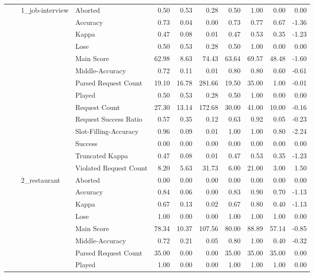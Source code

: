 \begin{tabular}{llllrrrrrrr}
\cline{3-11}
 &  & \multirow[t]{14}{*}{1_job-interview} & Aborted & 0.50 & 0.53 & 0.28 & 0.50 & 1.00 & 0.00 & 0.00 \\
 &  &  & Accuracy & 0.73 & 0.04 & 0.00 & 0.73 & 0.77 & 0.67 & -1.36 \\
 &  &  & Kappa & 0.47 & 0.08 & 0.01 & 0.47 & 0.53 & 0.35 & -1.23 \\
 &  &  & Lose & 0.50 & 0.53 & 0.28 & 0.50 & 1.00 & 0.00 & 0.00 \\
 &  &  & Main Score & 62.98 & 8.63 & 74.43 & 63.64 & 69.57 & 48.48 & -1.60 \\
 &  &  & Middle-Accuracy & 0.72 & 0.11 & 0.01 & 0.80 & 0.80 & 0.60 & -0.61 \\
 &  &  & Parsed Request Count & 19.10 & 16.78 & 281.66 & 19.50 & 35.00 & 1.00 & -0.01 \\
 &  &  & Played & 0.50 & 0.53 & 0.28 & 0.50 & 1.00 & 0.00 & 0.00 \\
 &  &  & Request Count & 27.30 & 13.14 & 172.68 & 30.00 & 41.00 & 10.00 & -0.16 \\
 &  &  & Request Success Ratio & 0.57 & 0.35 & 0.12 & 0.63 & 0.92 & 0.05 & -0.23 \\
 &  &  & Slot-Filling-Accuracy & 0.96 & 0.09 & 0.01 & 1.00 & 1.00 & 0.80 & -2.24 \\
 &  &  & Success & 0.00 & 0.00 & 0.00 & 0.00 & 0.00 & 0.00 & 0.00 \\
 &  &  & Truncated Kappa & 0.47 & 0.08 & 0.01 & 0.47 & 0.53 & 0.35 & -1.23 \\
 &  &  & Violated Request Count & 8.20 & 5.63 & 31.73 & 6.00 & 21.00 & 3.00 & 1.50 \\
\cline{3-11}
 &  & \multirow[t]{14}{*}{2_restaurant} & Aborted & 0.00 & 0.00 & 0.00 & 0.00 & 0.00 & 0.00 & 0.00 \\
 &  &  & Accuracy & 0.84 & 0.06 & 0.00 & 0.83 & 0.90 & 0.70 & -1.13 \\
 &  &  & Kappa & 0.67 & 0.13 & 0.02 & 0.67 & 0.80 & 0.40 & -1.13 \\
 &  &  & Lose & 1.00 & 0.00 & 0.00 & 1.00 & 1.00 & 1.00 & 0.00 \\
 &  &  & Main Score & 78.34 & 10.37 & 107.56 & 80.00 & 88.89 & 57.14 & -0.85 \\
 &  &  & Middle-Accuracy & 0.72 & 0.21 & 0.05 & 0.80 & 1.00 & 0.40 & -0.32 \\
 &  &  & Parsed Request Count & 35.00 & 0.00 & 0.00 & 35.00 & 35.00 & 35.00 & 0.00 \\
 &  &  & Played & 1.00 & 0.00 & 0.00 & 1.00 & 1.00 & 1.00 & 0.00 \\

\end{tabular}
